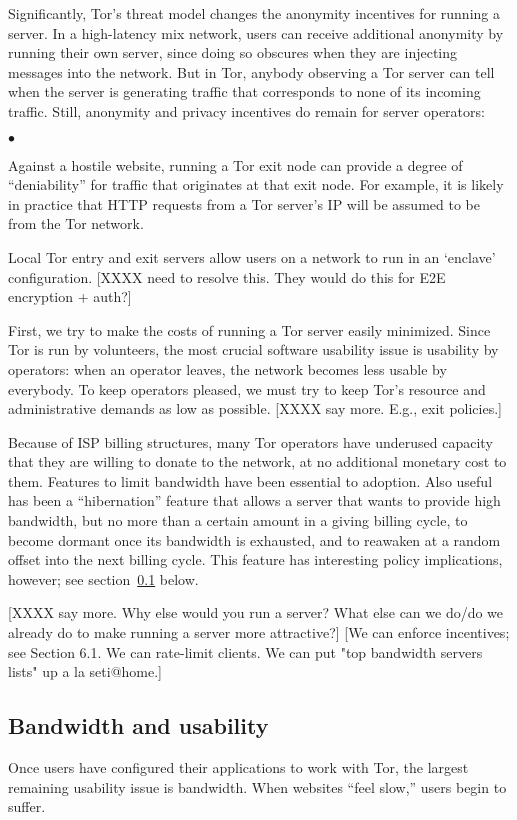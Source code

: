 \documentclass{llncs}
\newenvironment{tightlist}{\begin{list}{$\bullet$}{
  \setlength{\itemsep}{0mm}
    \setlength{\parsep}{0mm}
    }}{\end{list}}
\begin{document}
Significantly, Tor's threat model changes the anonymity incentives for running
a server.  In a high-latency mix network, users can receive additional
anonymity by running their own server, since doing so obscures when they are
injecting messages into the network.  But in Tor, anybody observing a Tor
server can tell when the server is generating traffic that corresponds to
none of its incoming traffic.
Still, anonymity and privacy incentives do remain for server operators:
\begin{tightlist}
\item Against a hostile website, running a Tor exit node can provide a degree
  of ``deniability'' for traffic that originates at that exit node.  For
  example, it is likely in practice that HTTP requests from a Tor server's IP
  will be assumed to be from the Tor network.
\item Local Tor entry and exit servers allow users on a network to run in an
  `enclave' configuration.  [XXXX need to resolve this. They would do this
   for E2E encryption + auth?]
\end{tightlist}

First, we try to make the costs of running a Tor server easily minimized.
Since Tor is run by volunteers, the most crucial software usability issue is
usability by operators: when an operator leaves, the network becomes less
usable by everybody.  To keep operators pleased, we must try to keep Tor's
resource and administrative demands as low as possible. [XXXX say more. E.g.,
exit policies.]

Because of ISP billing structures, many Tor operators have underused capacity
that they are willing to donate to the network, at no additional monetary
cost to them.  Features to limit bandwidth have been essential to adoption.
Also useful has been a ``hibernation'' feature that allows a server that
wants to provide high bandwidth, but no more than a certain amount in a
giving billing cycle, to become dormant once its bandwidth is exhausted, and
to reawaken at a random offset into the next billing cycle.  This feature has
interesting policy implications, however; see
section~\ref{subsec:bandwidth-and-usability} below.

[XXXX say more.  Why else would you run a server? What else can we do/do we
  already do to make running a server more attractive?]
[We can enforce incentives; see Section 6.1. We can rate-limit clients.
  We can put "top bandwidth servers lists" up a la seti@home.]

\subsection{Bandwidth and usability}
\label{subsec:bandwidth-and-usability}
Once users have configured their applications to work with Tor, the largest
remaining usability issue is bandwidth.  When websites ``feel slow,'' users
begin to suffer.
\end{document}
